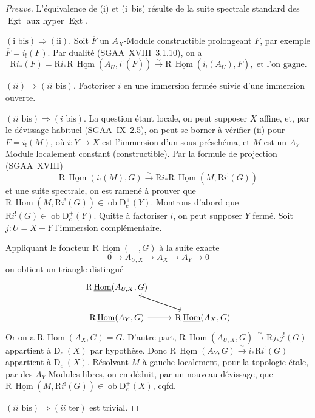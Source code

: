 \documentclass[11pt]{article}
\DeclareMathOperator{\Hom}{Hom}
\DeclareMathOperator{\Ext}{Ext}
\newcommand{\R}{\mathrm{R}}
\newcommand{\D}{\mathrm{D}}
\newcommand{\ob}{\operatorname{ob}}
\newcommand{\ol}[1]{\overline{#1}}
\providecommand{\Hom}{\operatorname{Hom}}
\providecommand{\ob}{\operatorname{ob}}
\providecommand{\R}{\mathrm R}
\providecommand{\Hom}{\operatorname{Hom}}
\begin{document}
\begin{proof}[Preuve]
L'équivalence de (i) et (i~bis) résulte de la suite spectrale standard des $\underline{\Ext}$ aux hyper $\underline{\Ext}$.

$(\text{i~bis}) \Rightarrow (\text{ii})$. Soit $\ol{F}$ un $A_X$-Module constructible prolongeant $F$, par exemple $\ol{F} = i_{!}(F)$. Par dualité (SGAA~XVIII~3.1.10), on a
\[
\R i_{*}(F) = \R i_{*} \R\,\underline{\Hom}(A_U, i^{!}(\ol{F})) \xrightarrow{\sim} \R\,\underline{\Hom}(i_{!}(A_U), \ol{F}), \text{ et l'on gagne.}
\]

$(ii) \Rightarrow (ii\text{~bis})$. Factoriser $i$ en une immersion fermée suivie d'une immersion ouverte.

$(ii\text{~bis}) \Rightarrow (i\text{~bis})$. La question étant locale, on peut supposer $X$ affine, et, par le dévissage habituel (SGAA~IX~2.5), on peut se borner à vérifier (ii) pour $F = i_{!}(M)$, où $i : Y \to X$ est l'immersion d'un sous-préschéma, et $M$ est un $A_Y$-Module localement constant (constructible). Par la formule de projection (SGAA~XVIII)
\[
\R\,\underline{\Hom}(i_{!}(M), G) \xrightarrow{\sim} \R i_{*} \R\,\underline{\Hom}(M, \R i^{!}(G))
\]
et une suite spectrale, on est ramené à prouver que $\R\,\underline{\Hom}(M, \R i^{!}(G)) \in \ob \D_c^{+}(Y)$. Montrons d'abord que $\R i^{!}(G) \in \ob \D_c^{+}(Y)$. Quitte à factoriser $i$, on peut supposer $Y$ fermé. Soit $j : U = X - Y$ l'immersion complémentaire.

Appliquant le foncteur $\R\,\underline{\Hom}(\quad, G)$ à la suite exacte
\[
0 \longrightarrow A_{U,X} \longrightarrow A_X \longrightarrow A_Y \longrightarrow 0
\]
on obtient un triangle distingué
\[
\begin{tikzcd}
\R\,\underline{\Hom}(A_{U,X}, G) \ar[dr] & \\
\R\,\underline{\Hom}(A_Y, G) \ar[r] & \R\,\underline{\Hom}(A_X, G) \ar[ul]
\end{tikzcd}
\]
Or on a $\R\,\underline{\Hom}(A_X, G) = G$. D'autre part, $\R\,\underline{\Hom}(A_{U,X}, G) \xrightarrow{\sim} \R j_{*} j^{!}(G)$ appartient à $\D_c^{+}(X)$ par hypothèse. Donc $\R\,\underline{\Hom}(A_Y, G) \xrightarrow{\sim} i_{*} \R i^{!}(G)$ appartient à $\D_c^{+}(X)$. Résolvant $M$ à gauche localement, pour la topologie étale, par des $A_Y$-Modules libres, on en déduit, par un nouveau dévissage, que $\R\,\underline{\Hom}(M, \R i^{!}(G)) \in \ob \D_c^{+}(X)$, cqfd.

$(ii\text{~bis}) \Rightarrow (ii\text{~ter})$ est trivial.


\end{proof}
\end{document}
